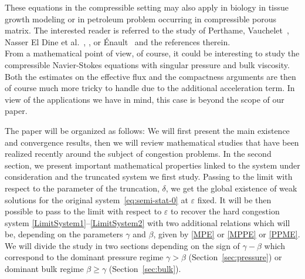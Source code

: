 \documentclass[JEP,XML,SOM,Unicode,NoEqCountersInSection]{cedram}
\newcommand{\<}{\bigl\langle}
\renewcommand{\>}{\bigr\rangle}
\theoremstyle{definition}
\theoremstyle{remark}
\let\ep\varepsilon
\begin{document}
These equations in the compressible setting may also apply in biology in tissue growth modeling or in petroleum problem occurring in compressible porous matrix. The interested reader is referred to the study of {Perthame}, {Vauchelet}~\cite{perthame2015}, {Nasser El Dine} et al.~\cite{Nasser2017}, \cite{nasser2019},
or {Énault}~\cite{Enault10} and the references therein.\\
From a mathematical point of view, of course, it could be interesting to study the compressible Navier-Stokes equations with singular pressure and bulk viscosity.
Both the estimates on the effective flux and the compactness arguments are then of course much more tricky to handle due to the additional acceleration term.
In view of the applications we have in mind, this case is beyond the scope of our paper.

The paper will be organized as follows: We will first present the main existence and convergence results,
then we will review mathematical studies that have been realized recently around the subject of congestion problems. In the second section, we present important mathematical
properties linked to the system under consideration and the truncated system we first study.
Passing to the limit with respect to the parameter of the truncation, $\delta$, we get the global existence of weak solutions for the original system~\eqref{eq:semi-stat-0} at $\ep$ fixed.
It will be then possible to pass to the limit with respect to $\varepsilon$ to recover the hard congestion system \eqref{LimitSystem1}--\eqref{LimitSystem2}
with two additional relations which will be, depending on the parameters $\gamma$ and $\beta$, given by \eqref{MPE} or \eqref{MPPE} or
\eqref{PPME}.
We will divide the study in two sections depending on the sign of $\gamma-\beta$ which correspond to the dominant pressure regime $\gamma > \beta$ (Section~\ref{sec:pressure}) or dominant bulk regime $\beta \ge \gamma$ (Section~\ref{sec:bulk}).
\end{document}
